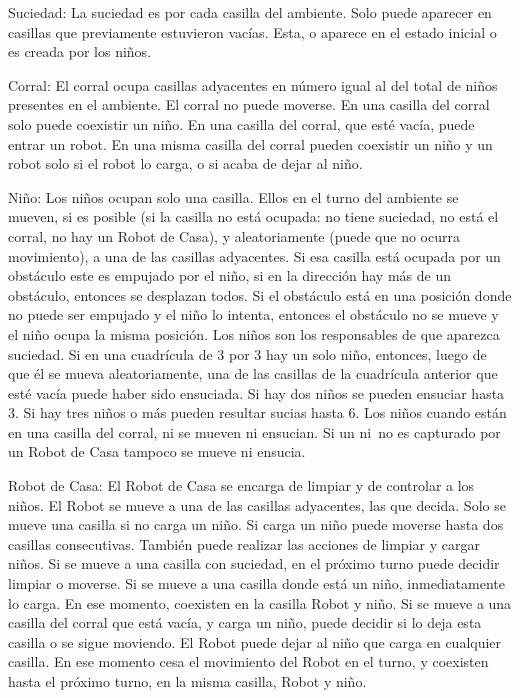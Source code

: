 \documentclass[twoside]{article}
\begin{document}
Suciedad: La suciedad es por cada casilla del ambiente. Solo puede aparecer en casillas que previamente estuvieron vac\'ias. Esta, o aparece en el estado inicial o es creada por los ni\~nos.

Corral: El corral ocupa casillas adyacentes en n\'umero igual al del total de ni\~nos presentes en el ambiente. El corral no puede moverse. En una casilla del corral solo puede coexistir un ni\~no. En una casilla del corral, que est\'e vac\'ia, puede entrar un robot. En una misma casilla del corral pueden coexistir un ni\~no y un robot solo si el robot lo carga, o si acaba de dejar al ni\~no.

Ni\~no: Los ni\~nos ocupan solo una casilla. Ellos en el turno del ambiente se mueven, si es posible (si la casilla no est\'a ocupada: no tiene suciedad, no est\'a el corral, no hay un Robot de Casa), y aleatoriamente (puede que no ocurra
movimiento), a una de las casillas adyacentes. Si esa casilla est\'a ocupada por un obst\'aculo este es empujado por el ni\~no, si en la direcci\'on hay m\'as de un obst\'aculo, entonces se desplazan todos. Si el obst\'aculo est\'a en una posici\'on donde no puede ser empujado y el ni\~no lo intenta, entonces el obst\'aculo no se mueve y el ni\~no ocupa la misma posici\'on. Los ni\~nos son los responsables de que aparezca suciedad. Si en una cuadr\'icula de 3 por 3 hay un solo ni\~no, entonces, luego de que \'el se mueva aleatoriamente, una de las casillas de la cuadr\'icula anterior que est\'e vac\'ia puede haber sido ensuciada. Si hay dos ni\~nos se pueden ensuciar hasta 3. Si hay tres ni\~nos o m\'as pueden resultar sucias hasta 6. Los ni\~nos cuando est\'an en una casilla del corral, ni se mueven ni ensucian. Si un ni~no es capturado por un Robot de Casa tampoco se mueve ni
ensucia.

Robot de Casa: El Robot de Casa se encarga de limpiar y de controlar a los ni\~nos. El Robot se mueve a una de las casillas adyacentes, las que decida. Solo se mueve una casilla si no carga un ni\~no. Si carga un ni\~no puede moverse hasta dos casillas consecutivas. Tambi\'en puede realizar las acciones de limpiar y cargar ni\~nos. Si se mueve a una casilla con suciedad, en el pr\'oximo turno puede decidir limpiar o moverse. Si se mueve a una casilla donde est\'a un ni\~no, inmediatamente lo carga. En ese momento, coexisten en la casilla Robot y ni\~no. Si se mueve a una casilla del corral que est\'a vac\'ia, y carga un ni\~no, puede decidir si lo deja esta casilla o se sigue moviendo. El Robot puede dejar al ni\~no que carga en cualquier casilla. En ese momento cesa el movimiento del Robot en el turno, y coexisten hasta el pr\'oximo turno, en la misma casilla, Robot y ni\~no.
\end{document}
